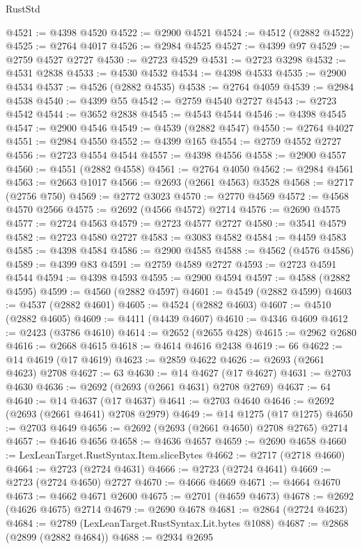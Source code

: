 \begin{lexlean}{RustStd}
\begin{coremodule}
@4521 := @4398 @4520
@4522 := @2900 @4521
@4524 := @4512 (@2882 @4522)
@4525 := @2764 @4017
@4526 := @2984 @4525
@4527 := @4399 @97
@4529 := @2759 @4527 @2727
@4530 := @2723 @4529
@4531 := @2723 @3298
@4532 := @4531 @2838
@4533 := @4530 @4532
@4534 := @4398 @4533
@4535 := @2900 @4534
@4537 := @4526 (@2882 @4535)
@4538 := @2764 @4059
@4539 := @2984 @4538
@4540 := @4399 @55
@4542 := @2759 @4540 @2727
@4543 := @2723 @4542
@4544 := @3652 @2838
@4545 := @4543 @4544
@4546 := @4398 @4545
@4547 := @2900 @4546
@4549 := @4539 (@2882 @4547)
@4550 := @2764 @4027
@4551 := @2984 @4550
@4552 := @4399 @165
@4554 := @2759 @4552 @2727
@4556 := @2723 @4554 @4544
@4557 := @4398 @4556
@4558 := @2900 @4557
@4560 := @4551 (@2882 @4558)
@4561 := @2764 @4050
@4562 := @2984 @4561
@4563 := @2663 @1017
@4566 := @2693 (@2661 @4563) @3528
@4568 := @2717 (@2756 @750)
@4569 := @2772 @3023
@4570 := @2770 @4569
@4572 := @4568 @4570 @2566
@4575 := @2692 (@4566 @4572) @2714
@4576 := @2690 @4575
@4577 := @2724 @4563
@4579 := @2723 @4577 @2727
@4580 := @3541 @4579
@4582 := @2723 @4580 @2727
@4583 := @3083 @4582
@4584 := @4459 @4583
@4585 := @4398 @4584
@4586 := @2900 @4585
@4588 := @4562 (@4576 @4586)
@4589 := @4399 @83
@4591 := @2759 @4589 @2727
@4593 := @2723 @4591 @4544
@4594 := @4398 @4593
@4595 := @2900 @4594
@4597 := @4588 (@2882 @4595)
@4599 := @4560 (@2882 @4597)
@4601 := @4549 (@2882 @4599)
@4603 := @4537 (@2882 @4601)
@4605 := @4524 (@2882 @4603)
@4607 := @4510 (@2882 @4605)
@4609 := @4411 (@4439 @4607)
@4610 := @4346 @4609
@4612 := @2423 (@3786 @4610)
@4614 := @2652 (@2655 @428)
@4615 := @2962 @2680
@4616 := @2668 @4615
@4618 := @4614 @4616 @2438
@4619 := 66
@4622 := @14 @4619 (@17 @4619)
@4623 := @2859 @4622
@4626 := @2693 (@2661 @4623) @2708
@4627 := 63
@4630 := @14 @4627 (@17 @4627)
@4631 := @2703 @4630
@4636 := @2692 (@2693 (@2661 @4631) @2708 @2769)
@4637 := 64
@4640 := @14 @4637 (@17 @4637)
@4641 := @2703 @4640
@4646 := @2692 (@2693 (@2661 @4641) @2708 @2979)
@4649 := @14 @1275 (@17 @1275)
@4650 := @2703 @4649
@4656 := @2692 (@2693 (@2661 @4650) @2708 @2765) @2714
@4657 := @4646 @4656
@4658 := @4636 @4657
@4659 := @2690 @4658
@4660 := LexLeanTarget.RustSyntax.Item.sliceBytes
@4662 := @2717 (@2718 @4660)
@4664 := @2723 (@2724 @4631)
@4666 := @2723 (@2724 @4641)
@4669 := @2723 (@2724 @4650) @2727
@4670 := @4666 @4669
@4671 := @4664 @4670
@4673 := @4662 @4671 @2600
@4675 := @2701 (@4659 @4673)
@4678 := @2692 (@4626 @4675) @2714
@4679 := @2690 @4678
@4681 := @2864 (@2724 @4623)
@4684 := @2789 (LexLeanTarget.RustSyntax.Lit.bytes @1088)
@4687 := @2868 (@2899 (@2882 @4684))
@4688 := @2934 @2695

\end{coremodule}
\end{lexlean}
